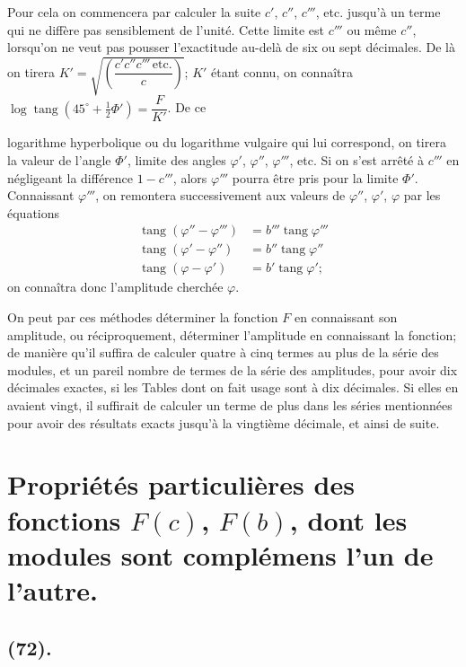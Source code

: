 \documentclass{article}
\begin{document}
Pour cela on commencera par calculer la suite $c'$, $c''$, $c'''$, etc. jusqu'à un terme qui ne diffère pas sensiblement de l'unité. Cette limite est $c'''$ ou même $c''$, lorsqu'on ne veut pas pousser l'exactitude au-delà de six ou sept décimales. De là on tirera $K'=\sqrt{\left(\dfrac{c'c''c'''\,\text{etc.}}{c}\right)}$; $K'$ étant connu, on connaîtra $\log\operatorname{tang}(45^{\circ}+\frac{1}{2}\Phi')=\dfrac{F}{K'}$. De ce

logarithme hyperbolique ou du logarithme vulgaire qui lui correspond, on tirera la valeur de l'angle $\Phi'$, limite des angles $\varphi'$, $\varphi''$, $\varphi'''$, etc. Si on s'est arrêté à $c'''$ en négligeant la différence $1-c'''$, alors $\varphi'''$ pourra être pris pour la limite $\Phi'$. Connaissant $\varphi'''$, on remontera successivement aux valeurs de $\varphi''$, $\varphi'$, $\varphi$ par les équations
\[ \begin{aligned} \operatorname{tang}(\varphi''-\varphi''')&=b'''\operatorname{tang}\varphi'''\\ \operatorname{tang}(\varphi'-\varphi'')&=b''\operatorname{tang}\varphi''\\ \operatorname{tang}(\varphi-\varphi')&=b'\operatorname{tang}\varphi'; \end{aligned} \]
on connaîtra donc l'amplitude cherchée $\varphi$.

On peut par ces méthodes déterminer la fonction $F$ en connaissant son amplitude, ou réciproquement, déterminer l'amplitude en connaissant la fonction; de manière qu'il suffira de calculer quatre à cinq termes au plus de la série des modules, et un pareil nombre de termes de la série des amplitudes, pour avoir dix décimales exactes, si les Tables dont on fait usage sont à dix décimales. Si elles en avaient vingt, il suffirait de calculer un terme de plus dans les séries mentionnées pour avoir des résultats exacts jusqu'à la vingtième décimale, et ainsi de suite.

\section*{Propriétés particulières des fonctions $F(c)$, $F(b)$, dont les modules sont complémens l'un de l'autre.}

\subsection*{(72).}
\end{document}
